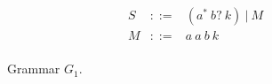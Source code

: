 \documentclass[runningheads,a4paper]{llncs}
\begin{document}
\begin{figure}[H]
    $$
    \begin{array}{crcl}
    S& ::= &(a^{*}\ b?\ k)\ |\ M \\
    M& ::= &a\ a\ b\ k \\
    \end{array}
    $$
    \caption{Grammar $G_1$.}
    \label{fig:grammarG1}
\end{figure}
\begin{figure}[H]
    \centering
    ~
\end{figure}
\end{document}
